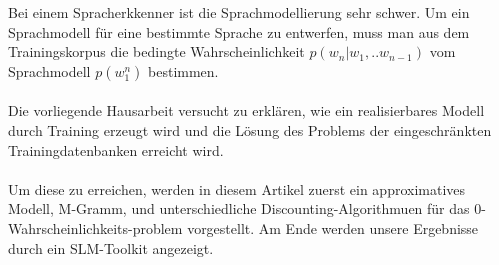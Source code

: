 Bei einem Spracherkkenner ist die Sprachmodellierung sehr schwer. Um ein Sprachmodell f\"ur eine bestimmte Sprache zu entwerfen, muss man aus dem Trainingskorpus die bedingte Wahrscheinlichkeit $p(w_{n}|w_{1},..w_{n-1})$   vom Sprachmodell $p(w_{1}^n)$   bestimmen.
\\
\\
Die vorliegende Hausarbeit versucht zu erkl\"aren, wie ein realisierbares Modell durch Training erzeugt wird und die L\"osung des Problems der eingeschr\"ankten Trainingdatenbanken erreicht wird. 
\\
\\
Um diese zu erreichen, werden in diesem Artikel zuerst ein approximatives Modell, M-Gramm, und unterschiedliche Discounting-Algorithmuen f\"ur das 0-Wahrscheinlichkeits-problem vorgestellt. Am Ende werden unsere Ergebnisse durch ein SLM-Toolkit angezeigt.
